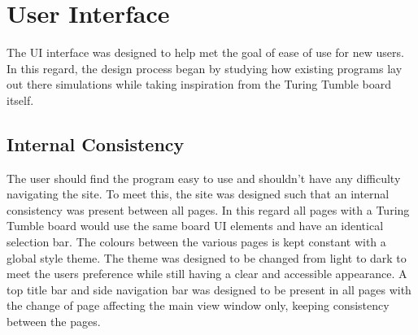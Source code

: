 \documentclass{l4proj}
\begin{document}


\section{User Interface}

The UI interface was designed to help met the goal of ease of use for new users. In this regard, the design process began by studying how existing programs lay out there simulations while taking inspiration from the Turing Tumble board itself.

\subsection{Internal Consistency}
The user should find the program easy to use and shouldn't have any difficulty navigating the site. To meet this, the site was designed such that an internal consistency was present between all pages. In this regard all pages with a Turing Tumble board would use the same board UI elements and have an identical selection bar. The colours between the various pages is kept constant with a global style theme. The theme was designed to be changed from light to dark to meet the users preference while still having a clear and accessible appearance. A top title bar and side navigation bar was designed to be present in all pages with the change of page affecting the main view window only, keeping consistency between the pages.
\end{document}

